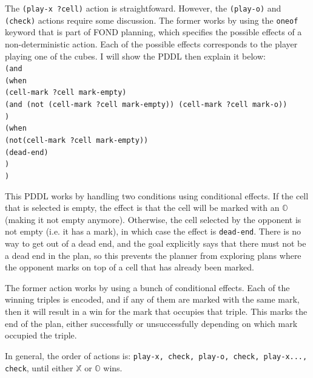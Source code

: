 \documentclass[11pt]{article}
\newcommand{\XX}{$\mathbb{X}$ }
\newcommand{\OO}{$\mathbb{O}$ }
\begin{document}
The \texttt{(play-x ?cell)} action is straightfoward. However, the \texttt{(play-o)} and \texttt{(check)} actions require some discussion. The former works by using the \texttt{oneof} keyword that is part of FOND planning, which specifies the possible effects of a non-deterministic action. Each of the possible effects corresponds to the player playing one of the cubes. I will show the PDDL then explain it below:\\
\texttt{(and \\
    \indent (when \\
    \indent \indent (cell-mark ?cell mark-empty) \\
    \indent \indent (and (not (cell-mark ?cell mark-empty)) (cell-mark ?cell mark-o))\\
    \indent )\\
    \indent (when \\
    \indent \indent (not(cell-mark ?cell mark-empty)) \\
    \indent \indent (dead-end) \\
    \indent)\\
)}

This PDDL works by handling two conditions using conditional effects. If the cell that is selected is empty, the effect is that the cell will be marked with an \OO (making it not empty anymore). Otherwise, the cell selected by the opponent is not empty (i.e. it has a mark), in which case the effect is \texttt{dead-end}. There is no way to get out of a dead end, and the goal explicitly says that there must not be a dead end in the plan, so this prevents the planner from exploring plans where the opponent marks on top of a cell that has already been marked.

The former action works by using a bunch of conditional effects. Each of the winning triples is encoded, and if any of them are marked with the same mark, then it will result in a win for the mark that occupies that triple. This marks the end of the plan, either successfully or unsuccessfully depending on which mark occupied the triple.

In general, the order of actions is: \texttt{play-x, check, play-o, check, play-x..., check}, until either \XX or \OO wins.
\end{document}
